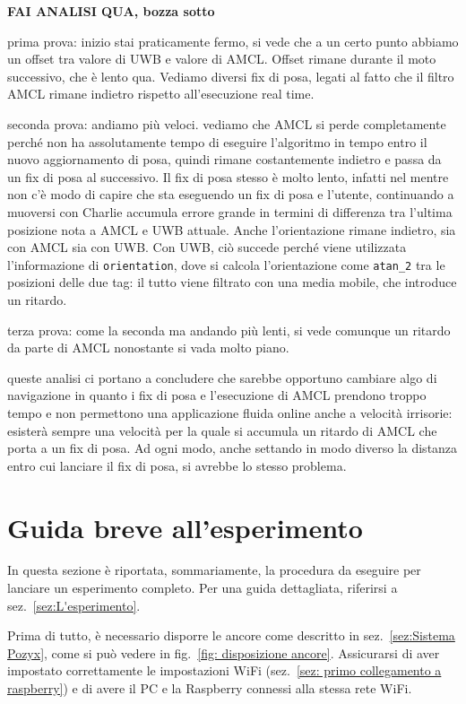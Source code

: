 \textbf{FAI ANALISI QUA, bozza sotto}


prima prova: inizio stai praticamente fermo, si vede che a un certo punto abbiamo un offset tra valore di UWB e valore di AMCL. Offset rimane durante il moto successivo, che 
è lento qua. Vediamo diversi fix di posa, legati al fatto che il filtro AMCL rimane indietro rispetto all'esecuzione real time. 

seconda prova: andiamo più veloci. vediamo che AMCL si perde completamente perché non ha assolutamente tempo di eseguire l'algoritmo in tempo entro il nuovo aggiornamento di 
posa, quindi rimane costantemente indietro e passa da un fix di posa al successivo. Il fix di posa stesso è molto lento, infatti nel mentre non c'è modo di capire
che sta eseguendo un fix di posa e l'utente, continuando a muoversi con Charlie accumula errore grande in termini di differenza tra l'ultima posizione nota a AMCL e UWB attuale.
Anche l'orientazione rimane indietro, sia con AMCL sia con UWB. Con UWB, ciò succede perché viene utilizzata l'informazione di \verb|orientation|, dove si calcola l'orientazione come \verb|atan_2| tra le posizioni delle due tag: il tutto viene filtrato con una media mobile, che introduce un ritardo.

terza prova: come la seconda ma andando più lenti, si vede comunque un ritardo da parte di AMCL nonostante si vada molto piano.

queste analisi ci portano a concludere che sarebbe opportuno cambiare algo di navigazione in quanto i fix di posa e l'esecuzione di AMCL prendono troppo tempo e non permettono una applicazione fluida online anche a velocità irrisorie: esisterà sempre una velocità per la quale si accumula un ritardo di AMCL che porta a un fix di posa. Ad ogni modo, anche settando in modo diverso la distanza entro cui lanciare il fix di posa, si avrebbe lo stesso problema.

\newpage
\section{Guida breve all'esperimento}
\label{sez: Guida breve all'esperimento}
In questa sezione è riportata, sommariamente, la procedura da eseguire per lanciare un esperimento completo. Per una guida dettagliata, riferirsi a 
sez.~\ref{sez:L'esperimento}. 

Prima di tutto, è necessario disporre le ancore come descritto in sez.~\ref{sez:Sistema Pozyx}, come si può vedere in fig.~\ref{fig: disposizione ancore}. 
Assicurarsi di aver impostato correttamente le impostazioni WiFi (sez.~\ref{sez: primo collegamento a raspberry}) e di avere il PC e la Raspberry connessi 
alla stessa rete WiFi.


